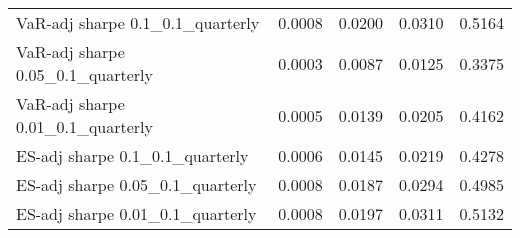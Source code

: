\begin{tabular}{lcccc}
VaR-adj sharpe 0.1_0.1_quarterly & 0.0008 & 0.0200 & 0.0310 & 0.5164\\
VaR-adj sharpe 0.05_0.1_quarterly & 0.0003 & 0.0087 & 0.0125 & 0.3375\\
VaR-adj sharpe 0.01_0.1_quarterly & 0.0005 & 0.0139 & 0.0205 & 0.4162\\
ES-adj sharpe 0.1_0.1_quarterly & 0.0006 & 0.0145 & 0.0219 & 0.4278\\
ES-adj sharpe 0.05_0.1_quarterly & 0.0008 & 0.0187 & 0.0294 & 0.4985\\
ES-adj sharpe 0.01_0.1_quarterly & 0.0008 & 0.0197 & 0.0311 & 0.5132\\
\bottomrule
\end{tabular}
